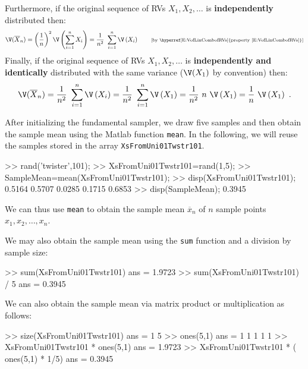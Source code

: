 Furthermore, if the original sequence of RVs $X_1,X_2,\ldots$ is {\bf independently} distributed then:
\begin{eqnarray}
\V(\overline{X}_n) 
= \left( \frac{1}{n} \right)^2 \V \left(  \sum_{i=1}^n X_i \right) 
=  \frac{1}{n^2} \ \sum_{i=1}^n \V \left( X_i \right) \qquad \text{{\scriptsize [by \hyperref[E:VofLinCombofRVs]{property \eqref{E:VofLinCombofRVs}}]}} \notag
\end{eqnarray}
Finally, if the original sequence of RVs $X_1,X_2,\ldots$ is {\bf independently and identically} distributed with the same variance ($\V(X_1)$ by convention) then:
\begin{equation}\label{E:VarOfSampleMeanOfIIDSeq}
\V(\overline{X}_n) 
=  \frac{1}{n^2} \ \sum_{i=1}^n \V \left( X_i \right)
= \frac{1}{n^2} \ \sum_{i=1}^n \V \left( X_1 \right)
=  \frac{1}{n^2} \ n \ \V \left( X_1 \right)
=  \frac{1}{n} \ \V \left( X_1 \right) \ .
\end{equation}

\begin{labwork}\label{LW:XsFromUni01Twstr101mean}
After initializing the fundamental sampler, we draw five samples and then obtain the sample mean using the {\sc Matlab} function {\tt mean}.  In the following, we will reuse the samples stored in the array {\tt XsFromUni01Twstr101}.
\begin{VrbM}
>> rand('twister',101); %
>> XsFromUni01Twstr101=rand(1,5); %
>> SampleMean=mean(XsFromUni01Twstr101);%
>> disp(XsFromUni01Twstr101); %
    0.5164    0.5707    0.0285    0.1715    0.6853
>> disp(SampleMean); %
    0.3945
\end{VrbM}
We can thus use {\tt mean} to obtain the sample mean $\overline{x}_n$ of $n$ sample points $x_1,x_2,\ldots,x_n$.

We may also obtain the sample mean using the {\tt sum} function and a division by sample size:
\begin{VrbM}
>> sum(XsFromUni01Twstr101) %
ans =    1.9723
>> sum(XsFromUni01Twstr101) / 5 %
ans =    0.3945
\end{VrbM}

We can also obtain the sample mean via matrix product or multiplication as follows:
\begin{VrbM}
>> size(XsFromUni01Twstr101) %
ans =     1     5
>> ones(5,1) %
ans =
     1
     1
     1
     1
     1
>> XsFromUni01Twstr101 * ones(5,1) %
ans =    1.9723
>> XsFromUni01Twstr101 * ( ones(5,1) * 1/5) %
ans =    0.3945
\end{VrbM}
\end{labwork}

